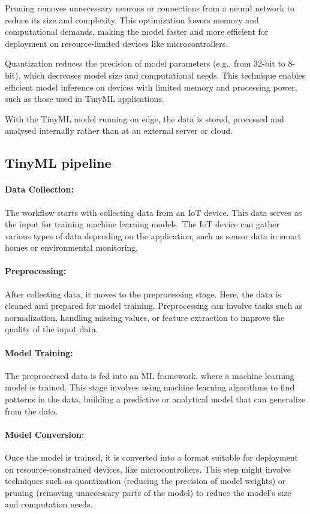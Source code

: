 \documentclass[twocolumn]{article}
\begin{document}
Pruning removes unnecessary neurons or connections from a neural network to reduce its size and complexity. This optimization lowers memory and computational demands, making the model faster and more efficient for deployment on resource-limited devices like microcontrollers.

Quantization reduces the precision of model parameters (e.g., from 32-bit to 8-bit), which decreases model size and computational needs. This technique enables efficient model inference on devices with limited memory and processing power, such as those used in TinyML applications.

With the TinyML model running on edge, the data is stored, processed and analysed internally rather
than at an external server or cloud. 

\subsection{TinyML pipeline}

\paragraph{Data Collection:}
	The workflow starts with collecting data from an IoT device. This data serves as the input for training machine learning models. The IoT device can gather various types of data depending on the application, such as sensor data in smart homes or environmental monitoring. \\[0.25cm]
\paragraph{Preprocessing:}
	After collecting data, it moves to the preprocessing stage. Here, the data is cleaned and prepared for model training. Preprocessing can involve tasks such as normalization, handling missing values, or feature extraction to improve the quality of the input data.\\[0.25cm]
\paragraph{Model Training:}
	The preprocessed data is fed into an ML framework, where a machine learning model is trained. This stage involves using machine learning algorithms to find patterns in the data, building a predictive or analytical model that can generalize from the data.\\[0.25cm]
\paragraph{Model Conversion:}
	Once the model is trained, it is converted into a format suitable for deployment on resource-constrained devices, like microcontrollers. This step might involve techniques such as quantization (reducing the precision of model weights) or pruning (removing unnecessary parts of the model) to reduce the model’s size and computation needs.\\[0.25cm]
\end{document}
